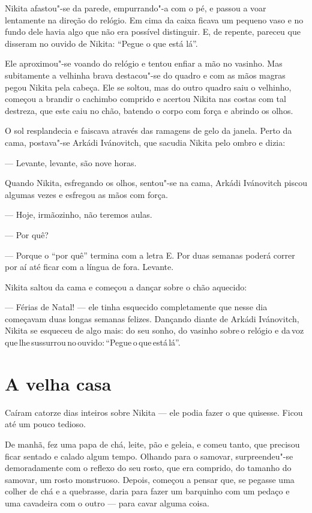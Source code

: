 Nikita afastou"-se da parede, empurrando"-a com o pé, e passou a voar
lentamente na direção do relógio. Em cima da caixa ficava um pequeno
vaso e no fundo dele havia algo que não era possível distinguir. E, de
repente, pareceu que disseram no ouvido de Nikita: ``Pegue o que está
lá''.

Ele aproximou"-se voando do relógio e tentou enfiar a mão no vasinho. Mas
subitamente a velhinha brava destacou"-se do quadro e com as mãos magras
pegou Nikita pela cabeça. Ele se soltou, mas do outro quadro saiu o
velhinho, começou a brandir o cachimbo comprido e acertou Nikita nas
costas com tal destreza, que este caiu no chão, batendo o corpo com força
e abrindo os olhos.

O sol resplandecia e faiscava através das ramagens de gelo da janela.
Perto da cama, postava"-se Arkádi Ivánovitch, que sacudia Nikita pelo
ombro e dizia:

--- Levante, levante, são nove horas.

Quando Nikita, esfregando os olhos, sentou"-se na cama, Arkádi Ivánovitch
piscou algumas vezes e esfregou as mãos com força.

--- Hoje, irmãozinho, não teremos aulas.

--- Por quê?

--- Porque o ``por quê'' termina com a letra E. Por duas semanas poderá
correr por aí até ficar com a língua de fora. Levante.

Nikita saltou da cama e começou a dançar sobre o chão aquecido:

--- Férias de Natal! --- ele tinha esquecido completamente que nesse dia 
começavam duas longas semanas felizes. Dançando diante de Arkádi
Ivánovitch, Nikita se esqueceu de algo mais: do seu sonho, do vasinho
sobre\,o relógio e da\,voz\,que\,lhe\,sussurrou\,no\,ouvido:\,``Pegue\,o\,que\,está\,lá''.

\chapter{A velha casa}

Caíram catorze dias inteiros sobre Nikita --- ele podia fazer o que
quisesse. Ficou até um pouco tedioso.

De manhã, fez uma papa de chá, leite, pão e geleia, e comeu tanto, que
precisou ficar sentado e calado algum tempo. Olhando para o samovar,
surpreendeu"-se demoradamente com o reflexo do seu rosto, que era
comprido, do tamanho do samovar, um rosto monstruoso. Depois, começou a
pensar que, se pegasse uma colher de chá e a quebrasse, daria para fazer
um barquinho com um pedaço e uma cavadeira com o outro --- para cavar
alguma coisa.

